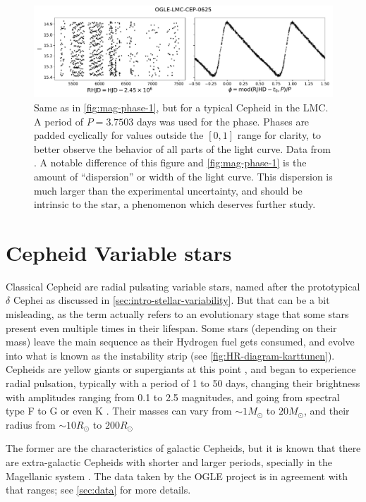 	
	\begin{figure}
		\centering
		\includegraphics[width=\textwidth]{img/mag_phase_LMC_0625.pdf}
		\caption[Light curve of OGLE-LMC-CEP-0625]{
			Same as in \autoref{fig:mag-phase-1}, but for a typical Cepheid in the LMC. 
			A period of $P=3.7503$ days was used for the phase.
			Phases are padded cyclically for values outside the $[0,1]$ range for clarity, to better observe the behavior of all parts of the light curve.
			Data from \cite{OGLE2016}. 
			A notable difference of this figure and \autoref{fig:mag-phase-1} is the amount of \enquote{dispersion} or width of the light curve.
			This dispersion is much larger than the experimental uncertainty, and should be intrinsic to the star, 
			a phenomenon which deserves further study.
		}
		\label{fig:mag-phase-2}
	\end{figure}
	
	
\section{Cepheid Variable stars}
	
	Classical Cepheid are radial pulsating variable stars, 
	named after the prototypical $\delta$ Cephei as discussed in \autoref{sec:intro-stellar-variability}.
	But that can be a bit misleading, 
	as the term actually refers to an evolutionary stage that some stars present even multiple times in their lifespan.
	Some stars (depending on their mass) leave the main sequence as their Hydrogen fuel gets consumed,
	and evolve into what is known as the instability strip (see \autoref{fig:HR-diagram-karttunen}).
	Cepheids are yellow giants or supergiants at this point \citep{Catelan2015}, and began to experience radial pulsation,
	typically with a period of 1 to 50 days, changing their brightness with amplitudes ranging from 0.1 to 2.5 magnitudes,
	and going from spectral type F to G or even K \citep{Karttunen2017}.
	Their masses can vary from $\sim1 M_\odot$ to $20 M_\odot$, and their radius from $\sim10R_\odot$ to $200R_\odot$
	
	The former are the characteristics of galactic Cepheids, 
	but it is known that there are extra-galactic Cepheids with shorter and larger periods, 
	specially in the Magellanic system \citep{Payne1967,Cox1980}. 
	The data taken by the OGLE project is in agreement with that ranges; see \autoref{sec:data} for more details.
	
